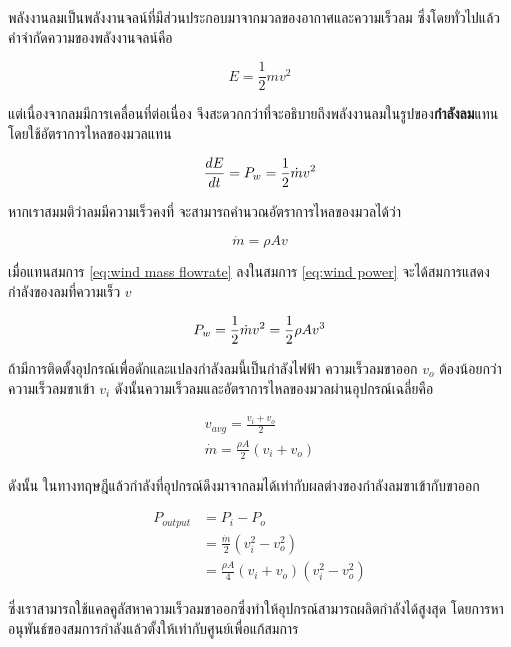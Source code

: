 \documentclass[11pt]{article}
\begin{document}
พลังงานลมเป็นพลังงานจลน์ที่มีส่วนประกอบมาจากมวลของอากาศและความเร็วลม ซึ่งโดยทั่วไปแล้ว คำจำกัดความของพลังงานจลน์คือ

$$ E = \frac{1}{2} mv^2 $$

แต่เนื่องจากลมมีการเคลื่อนที่ต่อเนื่อง จึงสะดวกกว่าที่จะอธิบายถึงพลังงานลมในรูปของ\textbf{กำลังลม}แทนโดยใช้อัตราการไหลของมวลแทน

\begin{equation}
  \label{eq:wind power}
  \frac{dE}{dt} = P_w = {1 \over 2} \dot{m} v^2
\end{equation}

หากเราสมมติว่าลมมีความเร็วคงที่ จะสามารถคำนวณอัตราการไหลของมวลได้ว่า

\begin{equation}
  \label{eq:wind mass flowrate}
  \dot{m} = \rho A v
\end{equation}

เมื่อแทนสมการ \ref{eq:wind mass flowrate} ลงในสมการ \ref{eq:wind power} จะได้สมการแสดงกำลังของลมที่ความเร็ว \(v\) 

\begin{equation}
 \label{eq:wind power v}
 P_w = {1 \over 2} \dot{m} v^2 = {1 \over 2} \rho A v^3
\end{equation}

ถ้ามีการติดตั้งอุปกรณ์เพื่อดักและแปลงกำลังลมนี้เป็นกำลังไฟฟ้า ความเร็วลมขาออก \(v_o\) ต้องน้อยกว่าความเร็วลมขาเข้า \(v_i\) ดังนั้นความเร็วลมและอัตราการไหลของมวลผ่านอุปกรณ์เฉลี่ยคือ

\begin{gather}
  v_{avg} = \frac{v_i + v_o}{2} \\
  \dot{m} = \frac{\rho A}{2} \left( v_i + v_o \right)
  \label{eq:average wind speed through turbine}
\end{gather}

ดังนั้น ในทางทฤษฎีแล้วกำลังที่อุปกรณ์ดึงมาจากลมได้เท่ากับผลต่างของกำลังลมขาเข้ากับขาออก

\begin{align*}
  P_{output} &= P_{i} - P_{o} \\
              &= \frac{\dot{m}}{2} \left( v_i^2 - v_o^2 \right) \\
              &= \frac{\rho A}{4} \left( v_i + v_o \right)\left( v_i^2 - v_o^2 \right)
\end{align*}

ซึ่งเราสามารถใช้แคลคูลัสหาความเร็วลมขาออกซึ่งทำให้อุปกรณ์สามารถผลิตกำลังได้สูงสุด โดยการหาอนุพันธ์ของสมการกำลังแล้วตั้งให้เท่ากับศูนย์เพื่อแก้สมการ
\end{document}
